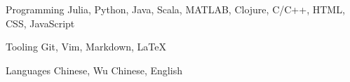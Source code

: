

\begin{cvskills}

  \cvskill
    {Programming} %
    {Julia, Python, Java, Scala, MATLAB, Clojure, C/C++, HTML, CSS, JavaScript} %

  \cvskill
    {Tooling} %
    {Git, Vim, Markdown, LaTeX} %

  \cvskill
    {Languages} %
    {Chinese, Wu Chinese, English} %

\end{cvskills}
